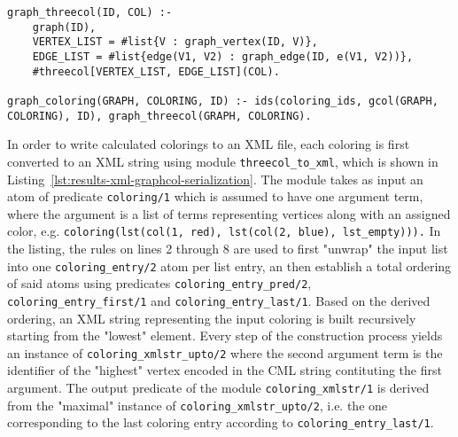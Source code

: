 \begin{lstlisting}[style=asp-code, label={lst:results-xml-graphcol-colorings}, caption={Calculating graph colorings.}]
graph_threecol(ID, COL) :- 
	graph(ID), 
	VERTEX_LIST = #list{V : graph_vertex(ID, V)}, 
	EDGE_LIST = #list{edge(V1, V2) : graph_edge(ID, e(V1, V2))}, 
	#threecol[VERTEX_LIST, EDGE_LIST](COL).

graph_coloring(GRAPH, COLORING, ID) :- ids(coloring_ids, gcol(GRAPH, COLORING), ID), graph_threecol(GRAPH, COLORING).    
\end{lstlisting}    

In order to write calculated colorings to an XML file, each coloring is first converted to an XML string using module \texttt{threecol\_to\_xml}, which is shown in Listing~\ref{lst:results-xml-graphcol-serialization}. The module takes as input an atom of predicate \texttt{coloring/1} which is assumed to have one argument term, where the argument is a list of terms representing vertices along with an assigned color, e.g. \texttt{coloring(lst(col(1, red), lst(col(2, blue), lst\_empty))).}
In the listing, the rules on lines 2 through 8 are used to first "unwrap" the input list into one \texttt{coloring\_entry/2} atom per list entry, an then establish a total ordering of said atoms using predicates \texttt{coloring\_entry\_pred/2}, \texttt{coloring\_entry\_first/1} and \texttt{coloring\_entry\_last/1}. Based on the derived ordering, an XML string representing the input coloring is built recursively starting from the "lowest" element. Every step of the construction process yields an instance of \texttt{coloring\_xmlstr\_upto/2} where the second argument term is the identifier of the "highest" vertex encoded in the CML string contituting the first argument. The output predicate of the module \texttt{coloring\_xmlstr/1} is derived from the "maximal" instance of \texttt{coloring\_xmlstr\_upto/2}, i.e. the one corresponding to the last coloring entry according to \texttt{coloring\_entry\_last/1}.

